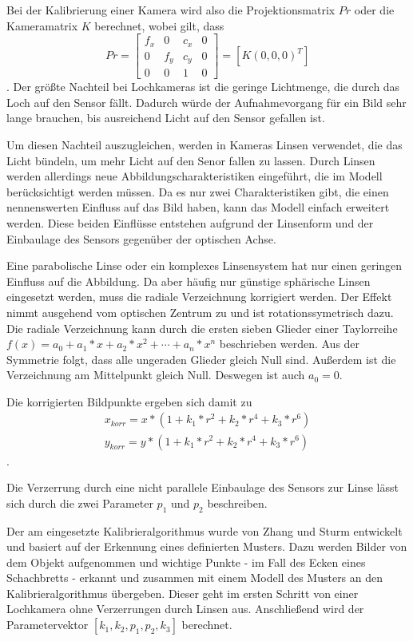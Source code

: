 Bei der Kalibrierung einer Kamera wird also die Projektionsmatrix $Pr$ oder die
Kameramatrix $K$ berechnet, wobei gilt, dass \begin{equation} Pr=
  \begin{bmatrix} f_x&0&c_x&0\\ 0&f_y&c_y&0\\ 0&0&1&0 \end{bmatrix} = \left[K
  \left(0,0,0\right)^T\right] \end{equation}.
\cite{Bradski2008}
Der größte Nachteil bei Lochkameras ist die geringe Lichtmenge, die durch das
Loch auf den Sensor fällt. Dadurch würde der Aufnahmevorgang für ein Bild sehr
lange brauchen, bis ausreichend Licht auf den Sensor gefallen ist.

Um diesen Nachteil auszugleichen, werden in Kameras Linsen verwendet, die das
Licht bündeln, um mehr Licht auf den Senor fallen zu lassen. Durch Linsen werden
allerdings neue Abbildungscharakteristiken eingeführt, die im Modell
berücksichtigt werden müssen. Da es nur zwei Charakteristiken gibt, die einen
nennenswerten Einfluss auf das Bild haben, kann das Modell einfach erweitert
werden. Diese beiden Einflüsse entstehen aufgrund der Linsenform und der
Einbaulage des Sensors gegenüber der optischen Achse. 

Eine parabolische Linse oder ein komplexes Linsensystem hat nur einen geringen
Einfluss auf die Abbildung. Da aber häufig nur günstige sphärische Linsen
eingesetzt werden, muss die radiale Verzeichnung korrigiert werden. Der Effekt
nimmt ausgehend vom optischen Zentrum zu und ist rotationssymetrisch dazu. Die
radiale Verzeichnung kann durch die ersten sieben Glieder einer Taylorreihe
$f(x)=a_0+a_1*x+a_2*x^2+\cdots+a_n*x^n$ beschrieben werden. Aus der Symmetrie
folgt, dass alle ungeraden Glieder gleich Null sind. Außerdem ist die
Verzeichnung am Mittelpunkt gleich Null. Deswegen ist auch $a_0=0$.

Die korrigierten Bildpunkte ergeben sich damit zu 
  \begin{align} x_{korr}=x*(1+k_1*r^2+k_2*r^4+k_3*r^6)\\
    y_{korr}=y*(1+k_1*r^2+k_2*r^4+k_3*r^6) \end{align}.

Die Verzerrung durch eine nicht parallele Einbaulage des Sensors zur Linse lässt
sich durch die zwei
Parameter $p_1$ und $p_2$ beschreiben.\cite{Bradski2008}

Der am \cob eingesetzte Kalibrieralgorithmus wurde von Zhang und Sturm
entwickelt und basiert auf der Erkennung eines definierten Musters. Dazu werden
Bilder von dem Objekt aufgenommen und wichtige Punkte - im Fall des \cob Ecken
eines Schachbretts - erkannt und zusammen mit einem Modell des Musters an den
Kalibrieralgorithmus übergeben. Dieser geht im ersten Schritt von einer
Lochkamera ohne Verzerrungen durch Linsen aus. Anschließend wird der
Parametervektor $\left[k_1,k_2,p_1,p_2,k_3\right]$ berechnet.\cite{zhang2000flexible}


